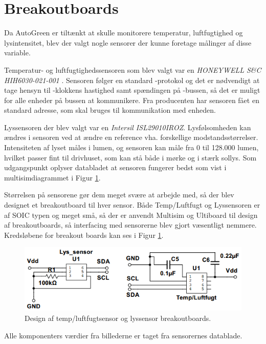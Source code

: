 \section{Breakoutboards} \label{sec:breakoutboards}

Da AutoGreen er tiltænkt at skulle monitorere temperatur, luftfugtighed og lysintensitet, blev der valgt nogle sensorer der kunne foretage målinger af disse variable. 

Temperatur- og luftfugtighedssensoren som blev valgt var en \textit{HONEYWELL S\&C  HIH6030-021-001} \cite{lib:TempHum_DS}. Sensoren følger en standard \IIC-protokol og det er nødvendigt at tage hensyn til \IIC-klokkens hastighed samt spændingen på \IIC-bussen, så det er muligt for alle enheder på bussen at kommunikere. Fra producenten har sensoren fået en standard adresse, som skal bruges til kommunikation med enheden.

Lyssensoren der blev valgt var en \textit{Intersil ISL29010IROZ}\cite{lib:LightSens}. Lysfølsomheden kan ændres i sensoren ved at ændre en reference vha. forskellige modstandsstørrelser. Intensiteten af lyset måles i lumen, og sensoren kan måle fra 0 til 128.000 lumen, hvilket passer fint til drivhuset, som kan stå både i mørke og i stærk sollys. Som udgangspunkt oplyser databladet at sensoren fungerer bedst som vist i multisimdiagrammet i Figur \ref{fig:temp_fugt_lys_design}.

Størrelsen på sensorene gør dem meget svære at arbejde med, så der blev designet et breakoutboard til hver sensor. 
Både Temp/Luftfugt og Lyssensoren er af SOIC typen og meget små, så der er anvendt Multisim og Ultiboard til design af breakoutboards, så interfacing med sensorerne blev gjort væsentligt nemmere. Kredsløbene for breakout boards kan ses i Figur \ref{fig:temp_fugt_lys_design}. 

\begin{figure}[h]
\centering
\includegraphics[trim=0 0 0 0, clip=true]{../fig/TempOgLys.png}
\caption{Design af temp/luftfugtsensor og lyssensor breakoutboards.}
\label{fig:temp_fugt_lys_design}
\end{figure}

Alle komponenters værdier fra billederne er taget fra sensorernes datablade.

\clearpage